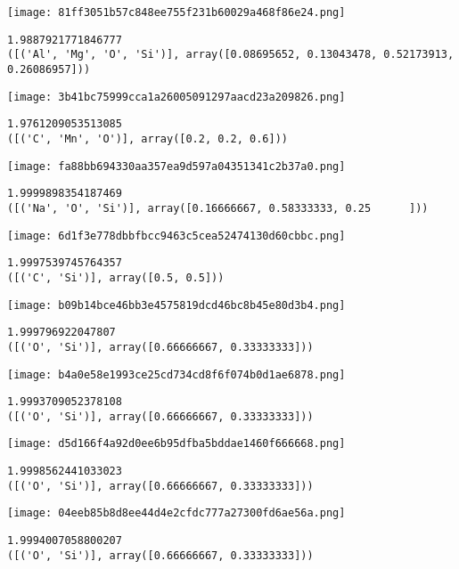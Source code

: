 \texttt{[image: 81ff3051b57c848ee755f231b60029a468f86e24.png]}

\begin{lstlisting}
1.9887921771846777
([('Al', 'Mg', 'O', 'Si')], array([0.08695652, 0.13043478, 0.52173913, 0.26086957]))
\end{lstlisting}

\texttt{[image: 3b41bc75999cca1a26005091297aacd23a209826.png]}

\begin{lstlisting}
1.9761209053513085
([('C', 'Mn', 'O')], array([0.2, 0.2, 0.6]))
\end{lstlisting}

\texttt{[image: fa88bb694330aa357ea9d597a04351341c2b37a0.png]}

\begin{lstlisting}
1.9999898354187469
([('Na', 'O', 'Si')], array([0.16666667, 0.58333333, 0.25      ]))
\end{lstlisting}

\texttt{[image: 6d1f3e778dbbfbcc9463c5cea52474130d60cbbc.png]}

\begin{lstlisting}
1.9997539745764357
([('C', 'Si')], array([0.5, 0.5]))
\end{lstlisting}

\texttt{[image: b09b14bce46bb3e4575819dcd46bc8b45e80d3b4.png]}

\begin{lstlisting}
1.999796922047807
([('O', 'Si')], array([0.66666667, 0.33333333]))
\end{lstlisting}

\texttt{[image: b4a0e58e1993ce25cd734cd8f6f074b0d1ae6878.png]}

\begin{lstlisting}
1.9993709052378108
([('O', 'Si')], array([0.66666667, 0.33333333]))
\end{lstlisting}

\texttt{[image: d5d166f4a92d0ee6b95dfba5bddae1460f666668.png]}

\begin{lstlisting}
1.9998562441033023
([('O', 'Si')], array([0.66666667, 0.33333333]))
\end{lstlisting}

\texttt{[image: 04eeb85b8d8ee44d4e2cfdc777a27300fd6ae56a.png]}

\begin{lstlisting}
1.9994007058800207
([('O', 'Si')], array([0.66666667, 0.33333333]))
\end{lstlisting}


